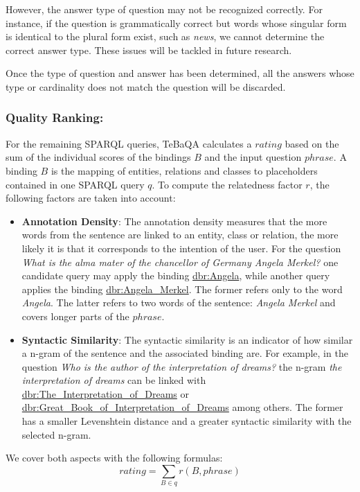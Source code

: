 \documentclass{IOS-Book-Article}
\begin{document}
However, the answer type of question may not be recognized correctly. For instance, if the question is grammatically correct but words whose singular form is identical to the plural form exist, such as \textit{news}, we cannot determine the correct answer type. These issues will be tackled in future research.

Once the type of question and answer has been determined, all the answers whose type or cardinality does not match the question will be discarded.

\subsubsection{Quality Ranking:}
For the remaining SPARQL queries, TeBaQA calculates a $rating$ based on the sum of the individual scores of the bindings $B$ and the input question $phrase$. A binding $B$ is the mapping of entities, relations and classes to placeholders contained in one SPARQL query $q$.  To compute the {relatedness factor} $r$, the following factors are taken into account:
\begin{itemize}
	\item \textbf{Annotation Density}: The annotation density measures that the more words from the sentence are linked to an entity, class or relation, the more likely it is that it corresponds to the intention of the user.  For the question \textit{What is the alma mater of the chancellor of Germany Angela Merkel?} one candidate query may apply the binding \url{dbr:Angela}, while another query applies the binding \url{dbr:Angela_Merkel}. The former refers only to the word \textit{Angela}. The latter refers to two words of the sentence: \textit{Angela Merkel} and covers longer parts of the $phrase$.
	
	\item \textbf{Syntactic Similarity}: The syntactic similarity is an indicator of how similar a n-gram of the sentence and the associated binding are. For example, in the question \textit{Who is the author of the interpretation of dreams?} the n-gram \textit{the interpretation of dreams} can be linked with \url{dbr:The_Interpretation_of_Dreams} or \url{dbr:Great_Book_of_Interpretation_of_Dreams} among others. The former has a smaller Levenshtein distance and a greater syntactic similarity with the selected n-gram.
\end{itemize}

We cover both aspects with the following formulas:
\[ rating = \sum_{B \in q} r(B, phrase)\]
\end{document}
